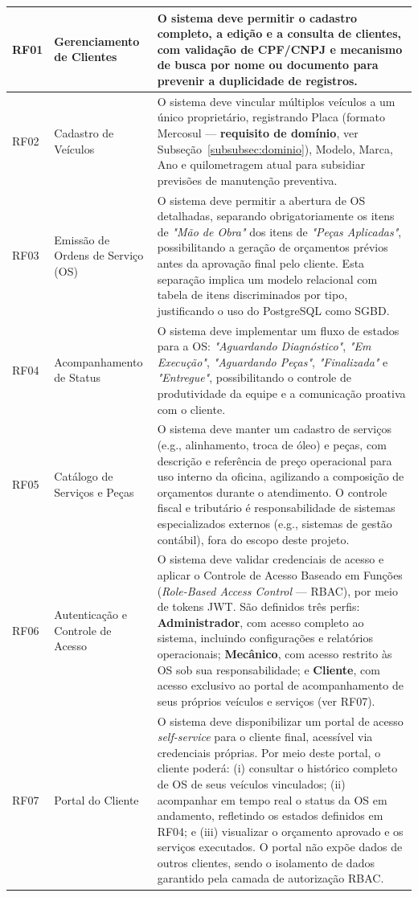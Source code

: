 \documentclass[12pt, a4paper]{article}
\begin{document}
\begin{longtable}{|p{1.2cm}|p{3.5cm}|p{9.5cm}|}
RF01 & Gerenciamento de Clientes &
O sistema deve permitir o cadastro completo, a edição e a consulta de clientes,
com validação de CPF/CNPJ e mecanismo de busca por nome ou documento para
prevenir a duplicidade de registros. \\
\hline
RF02 & Cadastro de Veículos &
O sistema deve vincular múltiplos veículos a um único proprietário, registrando
Placa (formato Mercosul --- \textbf{requisito de domínio}, ver
Subseção~\ref{subsubsec:dominio}), Modelo, Marca, Ano e quilometragem atual
para subsidiar previsões de manutenção preventiva. \\
\hline
RF03 & Emissão de Ordens de Serviço (OS) &
O sistema deve permitir a abertura de OS detalhadas, separando obrigatoriamente
os itens de \textit{"Mão de Obra"} dos itens de \textit{"Peças Aplicadas"},
possibilitando a geração de orçamentos prévios antes da aprovação final pelo
cliente. Esta separação implica um modelo relacional com tabela de itens
discriminados por tipo, justificando o uso do PostgreSQL como SGBD. \\
\hline
RF04 & Acompanhamento de Status &
O sistema deve implementar um fluxo de estados para a OS: \textit{"Aguardando
Diagnóstico"}, \textit{"Em Execução"}, \textit{"Aguardando Peças"},
\textit{"Finalizada"} e \textit{"Entregue"}, possibilitando o controle de
produtividade da equipe e a comunicação proativa com o cliente. \\
\hline
RF05 & Catálogo de Serviços e Peças &
O sistema deve manter um cadastro de serviços (e.g., alinhamento, troca de
óleo) e peças, com descrição e referência de preço operacional para uso interno
da oficina, agilizando a composição de orçamentos durante o atendimento.
O controle fiscal e tributário é responsabilidade de sistemas especializados
externos (e.g., sistemas de gestão contábil), fora do escopo deste projeto. \\
\hline
RF06 & Autenticação e Controle de Acesso &
O sistema deve validar credenciais de acesso e aplicar o Controle de Acesso
Baseado em Funções (\textit{Role-Based Access Control} --- RBAC), por meio de
tokens JWT. São definidos três perfis: \textbf{Administrador}, com acesso
completo ao sistema, incluindo configurações e relatórios operacionais;
\textbf{Mecânico}, com acesso restrito às OS sob sua responsabilidade;
e \textbf{Cliente}, com acesso exclusivo ao portal de acompanhamento de seus
próprios veículos e serviços (ver RF07). \\
\hline
RF07 & Portal do Cliente &
O sistema deve disponibilizar um portal de acesso \textit{self-service} para o
cliente final, acessível via credenciais próprias. Por meio deste portal, o
cliente poderá: (i) consultar o histórico completo de OS de seus veículos
vinculados; (ii) acompanhar em tempo real o status da OS em andamento,
refletindo os estados definidos em RF04; e (iii) visualizar o orçamento aprovado
e os serviços executados. O portal não expõe dados de outros clientes, sendo o
isolamento de dados garantido pela camada de autorização RBAC. \\

\end{longtable}
\end{document}
